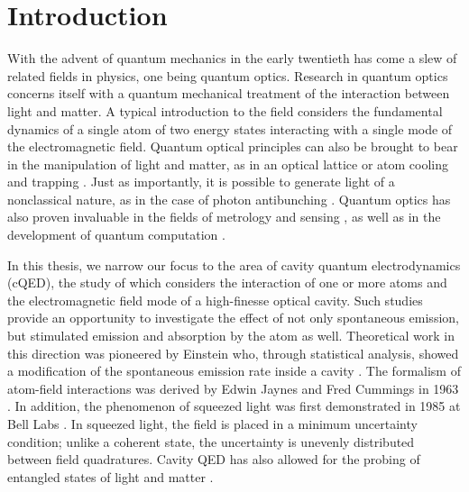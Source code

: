 \chapter{Introduction}
With the advent of quantum mechanics in the early twentieth has come a slew of related fields in physics, one being quantum optics. Research in quantum optics concerns itself with a quantum mechanical treatment of the interaction between light and matter. A typical introduction to the field considers the fundamental dynamics of a single atom of two energy states interacting with a single mode of the electromagnetic field. Quantum optical principles can also be brought to bear in the manipulation of light and matter, as in an optical lattice \cite{optlattice} or atom cooling and trapping \cite{cooltrap}. Just as importantly, it is possible to generate light of a nonclassical nature, as in the case of photon antibunching \cite{quantopt}. Quantum optics has also proven invaluable in the fields of metrology and sensing \cite{sensing}, as well as in the development of quantum computation \cite{quantcompinfo}.

In this thesis, we narrow our focus to the area of cavity quantum electrodynamics (cQED), the study of which considers the interaction of one or more atoms and the electromagnetic field mode of a high-finesse optical cavity. Such studies provide an opportunity to investigate the effect of not only spontaneous emission, but stimulated emission and absorption by the atom as well. Theoretical work in this direction was pioneered by Einstein who, through statistical analysis, showed a modification of the spontaneous emission rate inside a cavity \cite{einstein1917}. The formalism of atom-field interactions was derived by Edwin Jaynes and Fred Cummings in 1963 \cite{charliethesis}. In addition, the phenomenon of squeezed light was first demonstrated in 1985 at Bell Labs \cite{charliethesis}. In squeezed light, the field is placed in a minimum uncertainty condition; unlike a coherent state, the uncertainty is unevenly distributed between field quadratures. Cavity QED has also allowed for the probing of entangled states of light and matter \cite{charliethesis}.

